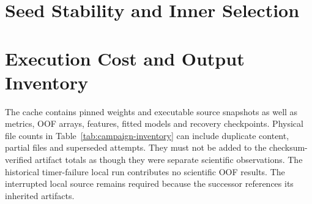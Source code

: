 

\section{Seed Stability and Inner Selection}
\begin{table}[htbp]
  \centering
  \caption{Single-seed and ensemble peptide-macro MAE for the matched local core experiment.}
  \label{tab:campaign-seeds}
  
\end{table}
\begin{table}[htbp]
  \centering
  \caption{Inner-selected epoch counts over 15 outer fits per local core recipe.}
  \label{tab:campaign-epochs}
  
\end{table}
\begin{table}[htbp]
  \centering
  \caption{Local frozen-family recipes chosen by the saved inner-MSE selector.
  Frequencies across seed/fold pairs are not independent votes for a model family.}
  \label{tab:campaign-nested}
  
\end{table}

\section{Execution Cost and Output Inventory}
\begin{table}[htbp]
  \centering
  \caption{Recorded durations of completed local job attempts, counting inherited work once.
  Earlier attempts of paused/resumed jobs may be absent; these are not GPU-active or full elapsed times.}
  \label{tab:campaign-timing}
  
\end{table}
The cache contains pinned weights and executable source snapshots as well as metrics, OOF arrays,
features, fitted models and recovery checkpoints. Physical file counts in Table~\ref{tab:campaign-inventory}
can include duplicate content, partial files and superseded attempts. They must not be added to
the checksum-verified artifact totals as though they were separate scientific observations.
The historical timer-failure local run contributes no scientific OOF results. The interrupted local
source remains required because the successor references its inherited artifacts.

\begin{table}[htbp]
  \centering
  \caption{Physical output inventory at review time. Weight caches and code snapshots are supporting
  assets, not evaluation datasets.}
  \label{tab:campaign-inventory}
  
\end{table}
